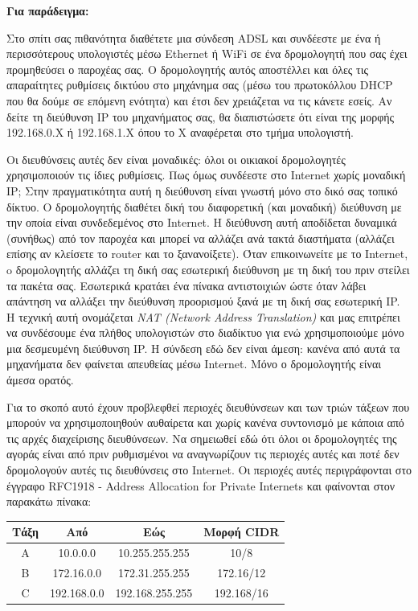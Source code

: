 \begin{inthebox}
\textbf{Για παράδειγμα:}

Στο σπίτι σας πιθανότητα διαθέτετε μια σύνδεση ADSL και συνδέεστε με ένα ή περισσότερους υπολογιστές μέσω Ethernet ή WiFi σε ένα δρομολογητή που σας έχει προμηθεύσει ο παροχέας σας. Ο δρομολογητής αυτός αποστέλλει και όλες τις απαραίτητες ρυθμίσεις δικτύου στο μηχάνημα σας (μέσω του πρωτοκόλλου DHCP που θα δούμε σε επόμενη ενότητα) και έτσι δεν χρειάζεται να τις κάνετε εσείς. Αν δείτε τη διεύθυνση IP του μηχανήματος σας, θα διαπιστώσετε ότι είναι της μορφής 192.168.0.X ή 192.168.1.X όπου το Χ αναφέρεται στο τμήμα υπολογιστή.

Οι διευθύνσεις αυτές δεν είναι μοναδικές: όλοι οι οικιακοί δρομολογητές χρησιμοποιούν τις ίδιες ρυθμίσεις. Πως όμως συνδέεστε στο Internet χωρίς μοναδική IP; Στην πραγματικότητα αυτή η διεύθυνση είναι γνωστή μόνο στο δικό σας τοπικό δίκτυο. Ο δρομολογητής διαθέτει δική του διαφορετική (και μοναδική) διεύθυνση με την οποία είναι συνδεδεμένος στο Internet. Η διεύθυνση αυτή αποδίδεται δυναμικά (συνήθως) από τον παροχέα και μπορεί να αλλάζει ανά τακτά διαστήματα (αλλάζει επίσης αν κλείσετε το router και το ξανανοίξετε). Όταν επικοινωνείτε με το Internet, o δρομολογητής αλλάζει τη δική σας εσωτερική διεύθυνση με τη δική του πριν στείλει τα πακέτα σας. Εσωτερικά κρατάει ένα πίνακα αντιστοιχιών ώστε όταν λάβει απάντηση να αλλάξει την διεύθυνση προορισμού ξανά με τη δική σας εσωτερική IP. Η τεχνική αυτή ονομάζεται \emph{NAT (Network Address Translation)} και μας επιτρέπει να συνδέσουμε ένα πλήθος υπολογιστών στο διαδίκτυο για ενώ χρησιμοποιούμε μόνο μια δεσμευμένη διεύθυνση IP. Η σύνδεση εδώ δεν είναι άμεση: κανένα από αυτά τα μηχανήματα δεν φαίνεται απευθείας μέσω Internet. Μόνο ο δρομολογητής είναι άμεσα ορατός.\\
\end{inthebox}

Για το σκοπό αυτό έχουν προβλεφθεί περιοχές διευθύνσεων και των τριών τάξεων που μπορούν να χρησιμοποιηθούν αυθαίρετα και χωρίς κανένα συντονισμό με κάποια από τις αρχές διαχείρισης διευθύνσεων. Να σημειωθεί εδώ ότι όλοι οι δρομολογητές της αγοράς είναι από πριν ρυθμισμένοι να αναγνωρίζουν τις περιοχές αυτές και ποτέ δεν δρομολογούν αυτές τις διευθύνσεις στο Internet. Οι περιοχές αυτές περιγράφονται στο έγγραφο RFC1918 - Address Allocation for Private Internets και φαίνονται στον παρακάτω πίνακα:

\begin{center}
\begin{tabular}{|c|c|c|c|}
\hline
\textbf{Τάξη} & \textbf{Από} & \textbf{Εώς} & \textbf{Μορφή CIDR} \\
\hline
A & 10.0.0.0 & 10.255.255.255 & 10/8\\
\hline
B & 172.16.0.0 & 172.31.255.255 & 172.16/12\\
\hline
C & 192.168.0.0 & 192.168.255.255 & 192.168/16\\
\hline
\end{tabular}
\end{center}

